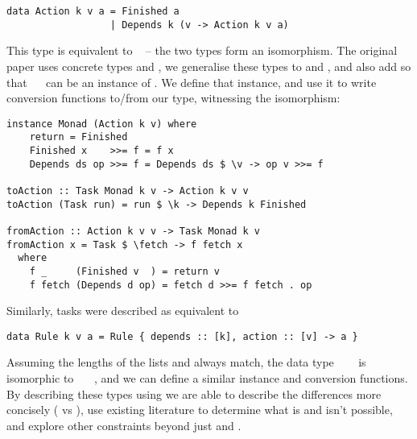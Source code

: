 \vspace{1mm}
\begin{verbatim}
data Action k v a = Finished a
                  | Depends k (v -> Action k v a)
\end{verbatim}
\vspace{1mm}

\noindent
This type is equivalent to ~ -- the two types form an
isomorphism. The original paper uses concrete types  and , we
generalise these types to  and , and also add  so that
~~ can be an instance of . We define that
 instance, and use it to write conversion functions to/from our
 type, witnessing the isomorphism:

\vspace{1mm}
\begin{verbatim}
instance Monad (Action k v) where
    return = Finished
    Finished x    >>= f = f x
    Depends ds op >>= f = Depends ds $ \v -> op v >>= f

toAction :: Task Monad k v -> Action k v v
toAction (Task run) = run $ \k -> Depends k Finished

fromAction :: Action k v v -> Task Monad k v
fromAction x = Task $ \fetch -> f fetch x
  where
    f _     (Finished v  ) = return v
    f fetch (Depends d op) = fetch d >>= f fetch . op
\end{verbatim}
\vspace{1mm}

\noindent
Similarly, \Make tasks were described as equivalent to

\vspace{1mm}
\begin{verbatim}
data Rule k v a = Rule { depends :: [k], action :: [v] -> a }
\end{verbatim}
\vspace{1mm}

Assuming the lengths of the lists \hs{[@@k]} and \hs{[@@v]} always match, the
data type ~~~ is isomorphic to
~~~, and we can define a similar
 instance and conversion functions. By describing these types
using  we are able to describe the differences more concisely
( vs ), use existing literature to determine what is
and isn't possible, and explore other constraints beyond just  and
.

